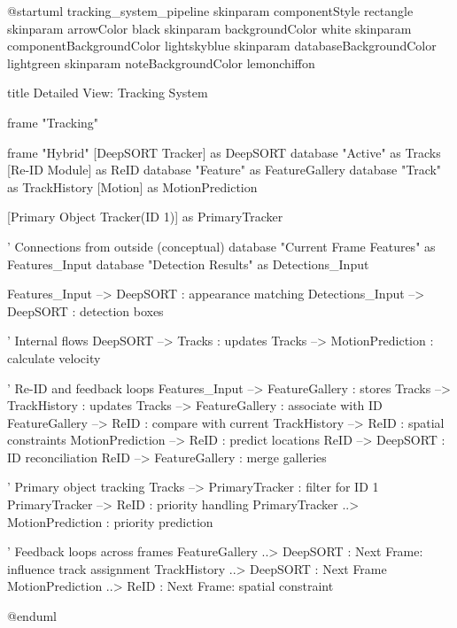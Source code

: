 \documentclass{scrartcl}
\begin{document}
\begin{plantuml}
@startuml tracking_system_pipeline
skinparam componentStyle rectangle
skinparam arrowColor black
skinparam backgroundColor white
skinparam componentBackgroundColor lightskyblue
skinparam databaseBackgroundColor lightgreen
skinparam noteBackgroundColor lemonchiffon

title Detailed View: Tracking System

frame "Tracking\nSystem" {
  frame "Hybrid\nTracker" {
    [DeepSORT Tracker] as DeepSORT
    database "Active\nTracks" as Tracks
    [Re-ID Module] as ReID
    database "Feature\nGallery" as FeatureGallery
    database "Track\nHistory" as TrackHistory
    [Motion\nPrediction] as MotionPrediction
  }
  
  [Primary Object Tracker\n(ID 1)] as PrimaryTracker
}

' Connections from outside (conceptual)
database "Current Frame Features" as Features_Input
database "Detection Results" as Detections_Input

Features_Input --> DeepSORT : appearance matching
Detections_Input --> DeepSORT : detection boxes

' Internal flows
DeepSORT --> Tracks : updates
Tracks --> MotionPrediction : calculate velocity

' Re-ID and feedback loops
Features_Input --> FeatureGallery : stores
Tracks --> TrackHistory : updates
Tracks --> FeatureGallery : associate with ID
FeatureGallery --> ReID : compare with current
TrackHistory --> ReID : spatial constraints
MotionPrediction --> ReID : predict locations
ReID --> DeepSORT : ID reconciliation
ReID --> FeatureGallery : merge galleries

' Primary object tracking
Tracks --> PrimaryTracker : filter for ID 1
PrimaryTracker --> ReID : priority handling
PrimaryTracker ..> MotionPrediction : priority prediction

' Feedback loops across frames
FeatureGallery ..> DeepSORT : Next Frame: influence track assignment
TrackHistory ..> DeepSORT : Next Frame
MotionPrediction ..> ReID : Next Frame: spatial constraint

@enduml

\end{plantuml}
\end{document}
